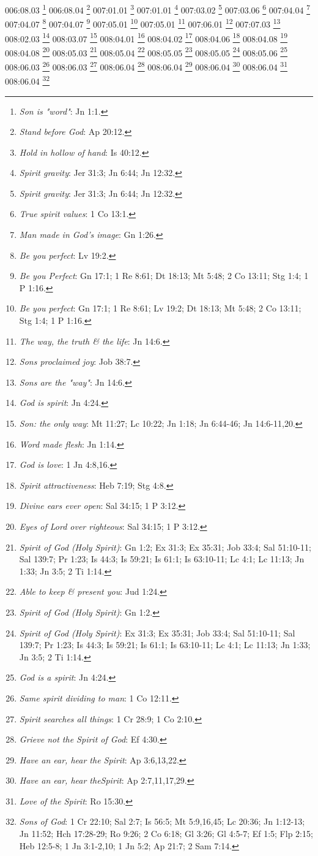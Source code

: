 {006:08.03 \footnote{\textit{Son is "word"}: Jn 1:1.}
006:08.04 \footnote{\textit{Stand before God}: Ap 20:12.}
007:01.01 \footnote{\textit{Hold in hollow of hand}: Is 40:12.}
007:01.01 \footnote{\textit{Spirit gravity}: Jer 31:3; Jn 6:44; Jn 12:32.}
007:03.02 \footnote{\textit{Spirit gravity}: Jer 31:3; Jn 6:44; Jn 12:32.}
007:03.06 \footnote{\textit{True spirit values}: 1 Co 13:1.}
007:04.04 \footnote{\textit{Man made in God's image}: Gn 1:26.}
007:04.07 \footnote{\textit{Be you perfect}: Lv 19:2.}
007:04.07 \footnote{\textit{Be you Perfect}: Gn 17:1; 1 Re 8:61; Dt 18:13; Mt 5:48; 2 Co 13:11; Stg 1:4; 1 P 1:16.}
007:05.01 \footnote{\textit{Be you perfect}: Gn 17:1; 1 Re 8:61; Lv 19:2; Dt 18:13; Mt 5:48; 2 Co 13:11; Stg 1:4; 1 P 1:16.}
007:05.01 \footnote{\textit{The way, the truth & the life}: Jn 14:6.}
007:06.01 \footnote{\textit{Sons proclaimed joy}: Job 38:7.}
007:07.03 \footnote{\textit{Sons are the "way"}: Jn 14:6.}
008:02.03 \footnote{\textit{God is spirit}: Jn 4:24.}
008:03.07 \footnote{\textit{Son: the only way}: Mt 11:27; Lc 10:22; Jn 1:18; Jn 6:44-46; Jn 14:6-11,20.}
008:04.01 \footnote{\textit{Word made flesh}: Jn 1:14.}
008:04.02 \footnote{\textit{God is love}: 1 Jn 4:8,16.}
008:04.06 \footnote{\textit{Spirit attractiveness}: Heb 7:19; Stg 4:8.}
008:04.08 \footnote{\textit{Divine ears ever open}: Sal 34:15; 1 P 3:12.}
008:04.08 \footnote{\textit{Eyes of Lord over righteous}: Sal 34:15; 1 P 3:12.}
008:05.03 \footnote{\textit{Spirit of God (Holy Spirit)}: Gn 1:2; Ex 31:3; Ex 35:31; Job 33:4; Sal 51:10-11; Sal 139:7; Pr 1:23; Is 44:3; Is 59:21; Is 61:1; Is 63:10-11; Lc 4:1; Lc 11:13; Jn 1:33; Jn 3:5; 2 Ti 1:14.}
008:05.04 \footnote{\textit{Able to keep & present you}: Jud 1:24.}
008:05.05 \footnote{\textit{Spirit of God (Holy Spirit)}: Gn 1:2.}
008:05.05 \footnote{\textit{Spirit of God (Holy Spirit)}: Ex 31:3; Ex 35:31; Job 33:4; Sal 51:10-11; Sal 139:7; Pr 1:23; Is 44:3; Is 59:21; Is 61:1; Is 63:10-11; Lc 4:1; Lc 11:13; Jn 1:33; Jn 3:5; 2 Ti 1:14.}
008:05.06 \footnote{\textit{God is a spirit}: Jn 4:24.}
008:06.03 \footnote{\textit{Same spirit dividing to man}: 1 Co 12:11.}
008:06.03 \footnote{\textit{Spirit searches all things}: 1 Cr 28:9; 1 Co 2:10.}
008:06.04 \footnote{\textit{Grieve not the Spirit of God}: Ef 4:30.}
008:06.04 \footnote{\textit{Have an ear, hear the Spirit}: Ap 3:6,13,22.}
008:06.04 \footnote{\textit{Have an ear, hear theSpirit}: Ap 2:7,11,17,29.}
008:06.04 \footnote{\textit{Love of the Spirit}: Ro 15:30.}
008:06.04 \footnote{\textit{Sons of God}: 1 Cr 22:10; Sal 2:7; Is 56:5; Mt 5:9,16,45; Lc 20:36; Jn 1:12-13; Jn 11:52; Hch 17:28-29; Ro 9:26; 2 Co 6:18; Gl 3:26; Gl 4:5-7; Ef 1:5; Flp 2:15; Heb 12:5-8; 1 Jn 3:1-2,10; 1 Jn 5:2; Ap 21:7; 2 Sam 7:14.}
}
